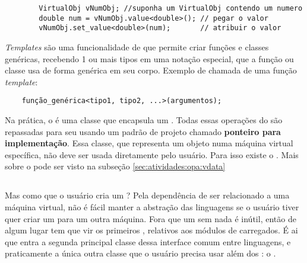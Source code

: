 \begin{itemize}
\begin{lstlisting}
        VirtualObj vNumObj; //suponha um VirtualObj contendo um numero
        double num = vNumObj.value<double>(); // pegar o valor
        vNumObj.set_value<double>(num);       // atribuir o valor
      \end{lstlisting}
  \end{itemize}

  \begin{framed}
    \textit{Templates} são uma funcionalidade de \CXX{} que permite
    criar funções e classes genéricas, recebendo 1 ou mais tipos\footnotemark{} em uma notação especial,
    que a função ou classe usa de forma genérica em seu corpo. Exemplo de chamada de uma
    função \textit{template}:
  \begin{verbatim}
    função_genérica<tipo1, tipo2, ...>(argumentos);\end{verbatim}
  \end{framed}
  
  
  Na prática, o \VObj{} é uma classe que encapsula um \VData{}. Todas essas operações do
  \VObj{} são repassadas para seu \VData{} usando um padrão de projeto chamado
  \textbf{ponteiro para implementação}\footnotemark{}. Essa classe, que representa um objeto numa máquina
  virtual específica, não deve ser usada diretamente pelo usuário. Para isso existe o
  \VObj{}. Mais sobre o \VData{} pode ser visto na subseção \ref{sec:atividades:opa:vdata}
  
  
  \subsection{\SMgr{}}
  \label{sec:atividades:opa:smgr}
  Mas como que o usuário cria um \VObj{}? Pela dependência de ser relacionado a uma máquina virtual,
  não é fácil manter a abstração das linguagens se o usuário tiver quer criar um \VObj{} para um outra
  máquina. Fora que um \VObj{} sem nada é inútil, então de algum lugar tem que vir os primeiros ,
  relativos aos módulos de \script{} carregados. É ai que entra a segunda principal classe dessa interface 
  comum entre linguagens, e praticamente a única outra classe que o usuário precisa usar além dos :
  o \SMgr{}.
  
